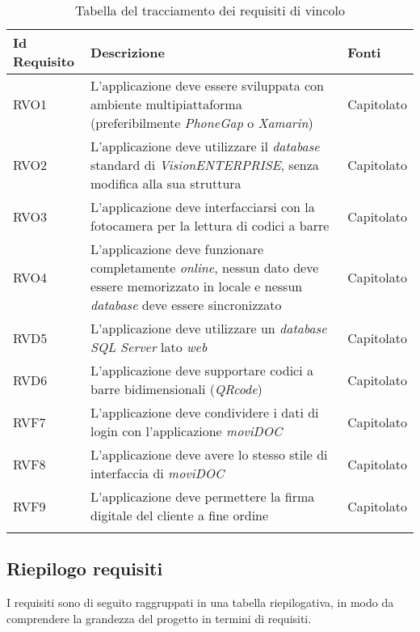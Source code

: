{\renewcommand{\arraystretch}{2}
\begin{center}
\begin{longtable}{ | >{\centering\arraybackslash}p{2.5cm} | >{\arraybackslash}p{7cm} | >{\centering\arraybackslash}p{2cm} | }
\hline
\textbf{Id Requisito} & \textbf{Descrizione} & \textbf{Fonti} \\ \hline
\endhead
RVO1 & L'applicazione deve essere sviluppata con ambiente multipiattaforma (preferibilmente \textit{PhoneGap} o \textit{Xamarin}) & Capitolato \\ \hline
RVO2 & L'applicazione deve utilizzare il \textit{database} standard di \textit{VisionENTERPRISE}, senza modifica alla sua struttura & Capitolato \\ \hline
RVO3 & L'applicazione deve interfacciarsi con la fotocamera per la lettura di codici a barre & Capitolato \\ \hline
RVO4 & L'applicazione deve funzionare completamente \textit{online}, nessun dato deve essere memorizzato in locale e nessun \textit{database} deve essere sincronizzato & Capitolato \\ \hline
RVD5 & L'applicazione deve utilizzare un \textit{database} \textit{SQL Server} lato \textit{web} & Capitolato \\ \hline
RVD6 & L'applicazione deve supportare codici a barre bidimensionali (\textit{QRcode}) & Capitolato \\ \hline
RVF7 & L'applicazione deve condividere i dati di login con l'applicazione \textit{moviDOC} & Capitolato \\ \hline
RVF8 & L'applicazione deve avere lo stesso stile di interfaccia di \textit{moviDOC} & Capitolato \\ \hline
RVF9 & L'applicazione deve permettere la firma digitale del cliente a fine ordine & Capitolato \\ \hline
\caption{Tabella del tracciamento dei requisiti di vincolo}
\end{longtable}
\end{center}}

\newpage

\subsection{Riepilogo requisiti}

I requisiti sono di seguito raggruppati in una tabella riepilogativa, in modo da comprendere la grandezza del progetto in termini di requisiti.

